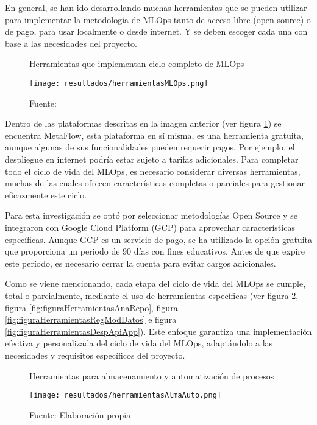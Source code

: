 En general, se han ido desarrollando muchas herramientas que se pueden utilizar para implementar la metodología de MLOps tanto de acceso libre (open source) o de pago, para usar localmente o desde internet. Y se deben escoger cada una con base a las necesidades del proyecto.

\begin{figure}[h]
\centering
\caption{Herramientas que implementan ciclo completo de MLOps}
\texttt{[image: resultados/herramientasMLOps.png]}
\caption*{\footnotesize Fuente: \cite{neptune2024}}
\label{fig:figuraHerramientasMLOps}
\end{figure}

Dentro de las plataformas descritas en la imagen anterior (ver figura \ref{fig:figuraHerramientasMLOps}) se encuentra MetaFlow, esta plataforma en sí misma, es una herramienta gratuita, aunque algunas de sus funcionalidades pueden requerir pagos. Por ejemplo, el despliegue en internet podría estar sujeto a tarifas adicionales. Para completar todo el ciclo de vida del MLOps, es necesario considerar diversas herramientas, muchas de las cuales ofrecen características completas o parciales para gestionar eficazmente este ciclo.

Para esta investigación se optó por seleccionar metodologías Open Source y se integraron  con Google Cloud Platform (GCP) para aprovechar características específicas. Aunque GCP es un servicio de pago, se ha utilizado la opción gratuita que proporciona un periodo de 90 días con fines educativos. Antes de que expire este período, es necesario cerrar la cuenta para evitar cargos adicionales.

Como se viene mencionando, cada etapa del ciclo de vida del MLOps se cumple, total o parcialmente, mediante el uso de herramientas específicas (ver figura \ref{fig:figuraHerramientasAlmaAuto}, figura \ref{fig:figuraHerramientasAnaRepo}, figura \ref{fig:figuraHerramientasRegModDatos} e figura \ref{fig:figuraHerramientasDespApiApp}). Este enfoque garantiza una implementación efectiva y personalizada del ciclo de vida del MLOps, adaptándolo a las necesidades y requisitos específicos del proyecto.

\begin{figure}[h]
\centering
\caption{Herramientas para almacenamiento y automatización de procesos}
\texttt{[image: resultados/herramientasAlmaAuto.png]}
\caption*{\footnotesize Fuente: Elaboración propia}
\label{fig:figuraHerramientasAlmaAuto}
\end{figure}

